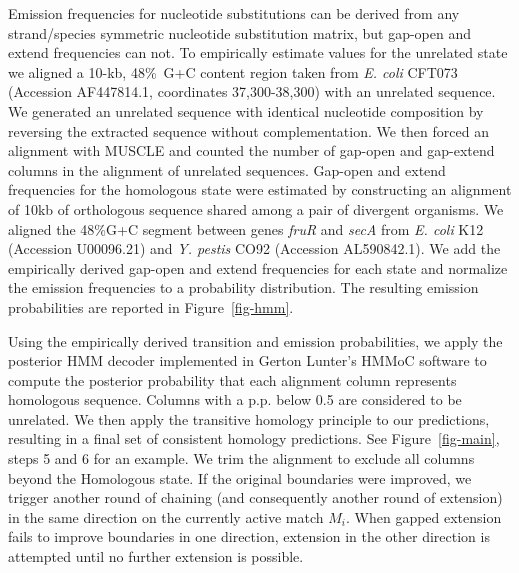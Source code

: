 \documentclass{llncs}
\begin{document}
Emission frequencies for nucleotide substitutions can be derived from
any strand/species symmetric nucleotide substitution matrix, but gap-open
and extend frequencies can not.  To empirically estimate values
for the unrelated state we aligned a 10-kb, 48\%~G+C content region
taken from \emph{E. coli} CFT073 (Accession AF447814.1, coordinates
37,300-38,300) with an unrelated sequence.  We generated an unrelated
sequence with identical nucleotide composition by reversing the
extracted sequence without complementation.  We then forced an
alignment with MUSCLE and counted the number of gap-open and gap-extend
columns in the alignment of unrelated sequences.  Gap-open and
extend frequencies for the homologous state were estimated by
constructing an alignment of 10kb of orthologous sequence shared among
a pair of divergent organisms.  We aligned the 48\%G+C segment between
genes \textit{fruR} and \textit{secA} from \textit{E. coli} K12
(Accession U00096.21) and \emph{Y. pestis} CO92 (Accession
AL590842.1). We add the empirically derived gap-open and extend
frequencies for each state and normalize the emission frequencies to a
probability distribution.  The resulting emission probabilities are
reported in Figure~\ref{fig-hmm}.

Using the empirically derived transition and emission probabilities,
we apply the posterior HMM decoder implemented in Gerton Lunter's
HMMoC software\cite{hmmoc} to compute the posterior probability that
each alignment column represents homologous sequence.  Columns with a
p.p. below 0.5 are considered to be unrelated.  We then apply the
transitive homology principle to our predictions, resulting in a final
set of consistent homology predictions.  See Figure~\ref{fig-main},
steps 5 and 6 for an example. We trim the alignment to exclude all
columns beyond the Homologous state. If the original boundaries were
improved, we trigger another round of chaining (and consequently
another round of extension) in the same direction on the currently
active match $M_i$.  When gapped extension fails to improve boundaries
in one direction, extension in the other direction is attempted until
no further extension is possible.
\end{document}
